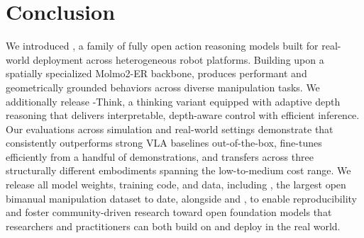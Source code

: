 \section{Conclusion}
\label{sec:conclude}

We introduced \molmoactt, a family of fully open action reasoning models built for real-world deployment across heterogeneous robot platforms. Building upon a spatially specialized Molmo2-ER backbone, \molmoactt produces performant and geometrically grounded behaviors across diverse manipulation tasks. We additionally release \molmoactt-Think, a thinking variant equipped with adaptive depth reasoning that delivers interpretable, depth-aware control with efficient inference. Our evaluations across simulation and real-world settings demonstrate that \molmoactt consistently outperforms strong VLA baselines out-of-the-box, fine-tunes efficiently from a handful of demonstrations, and transfers across three structurally different embodiments spanning the low-to-medium cost range. We release all model weights, training code, and data, including \molmoacttyamdata, the largest open bimanual manipulation dataset to date, alongside \molmoacttdroiddata and \molmoacttsodata, to enable reproducibility and foster community-driven research toward open foundation models that researchers and practitioners can both build on and deploy in the real world.
